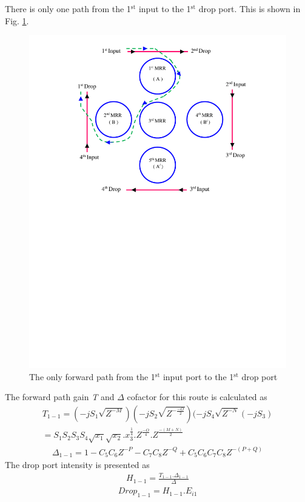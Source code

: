 \documentclass{osa-article}
\begin{document}
There is only one path from the 1$^{\text{st}}$ input to the 1$^{\text{st}}$ drop port. This is shown in Fig. \ref{fig2a_ID11}.\\
  \begin{figure}[tb]
\centering
\includegraphics[width=3 in]{figs/fig2a_ID11.pdf}
	\caption{The only forward path from the 1$^{\text{st}}$ input port to the 1$^{\text{st}}$ drop port}
	\label{fig2a_ID11}
\end{figure} 
The forward path gain \textit {T} and $\Delta$ cofactor for this route is calculated as\\
\begin{equation}
\begin{split}
T_{1-1}=(-jS_{1}\sqrt{Z^{-M}})(-jS_{2}\sqrt{Z^{-\frac{-O}{2}}})(-jS_{4}\sqrt{Z^{-N}}(-jS_3)\\
=S_1S_2S_3S_4\sqrt{x_1}\sqrt{x_2}.{x^{\frac{1}{4}}_3}.Z^{\frac{-O}{4}}.Z^{\frac{-(M+N)}{2}}
\label{eqa48}
\end{split}
\end{equation}
\begin{equation}
\begin{split}
\Delta_{1-1}=1-C_5C_6Z^{-P}-C_7C_8Z^{-Q}+C_5C_6C_7C_8Z^{-(P+Q)}
\label{eqa49}
\end{split}
\end{equation}
The drop port intensity is presented as\\
\begin{equation}
\begin{split}
H_{1-1}=\frac{T_{1-1}.\Delta_{1-1}}{\Delta}
\label{eqa50}
\end{split}
\end{equation}
\begin{equation}
\begin{split}
Drop_{1-1}=H_{1-1}.E_{i1}
\label{eqa51}
\end{split}
\end{equation}
\end{document}
